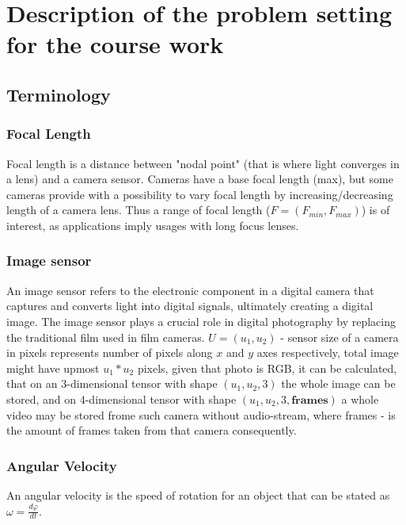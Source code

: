 \chapter{Description of the problem setting for the course work}
\label{cha:Osnovania-ENG}

\section{Terminology}

\subsection{Focal Length}
Focal length is a distance between "nodal point" (that is where light converges in a lens) and a camera sensor\cite{FocalLength}. Cameras have a base focal length (max), but some cameras provide with a possibility to vary focal length by increasing/decreasing length of a camera lens. Thus a range of focal length ($F=(F_{min},F_{max})$) is of interest, as applications imply usages with long focus lenses.


\subsection{Image sensor}
 An image sensor refers to the electronic component in a digital camera that captures and converts light into digital signals, ultimately creating a digital image. The image sensor plays a crucial role in digital photography by replacing the traditional film used in film cameras. $U=(u_1,u_2)$ - sensor size of a camera in pixels represents number of pixels along $x$ and $y$ axes respectively, total image might have upmost $u_1*u_2$ pixels, given that photo is RGB, it can be calculated, that on an 3-dimensional tensor with shape $(u_1, u_2, 3)$ the whole image can be stored, and on 4-dimensional tensor with shape $(u_1, u_2, 3, \textbf{frames})$ a whole video may be stored frome such camera without audio-stream, where frames - is the amount of frames taken from that camera consequently.



\subsection{Angular Velocity}
An angular velocity is the speed of rotation for an object that can be stated as ${\displaystyle \omega ={\frac {d\varphi }{dt}}}$.

